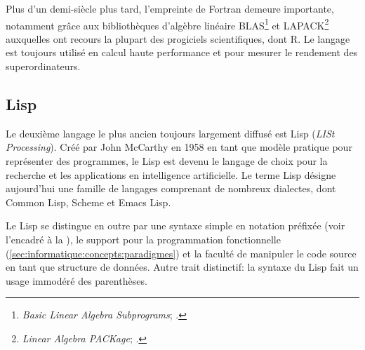 Plus d'un demi-siècle plus tard, l'empreinte de Fortran demeure
importante, notamment grâce aux bibliothèques d'algèbre linéaire
BLAS\footnote{%
  \emph{Basic Linear Algebra Subprograms};
  .} %
et LAPACK\footnote{%
  \emph{Linear Algebra PACKage};
  .} %
auxquelles ont recours la plupart des progiciels scientifiques, dont
R. Le langage est toujours utilisé en calcul haute performance et pour
mesurer le rendement des superordinateurs.


\subsection{Lisp}
\label{sec:informatique:historique:lisp}

Le deuxième langage le plus ancien toujours largement diffusé est
Lisp (\emph{LISt Processing}). Créé par John McCarthy en
1958 en tant que modèle pratique pour représenter des programmes, le
Lisp est devenu le langage de choix pour la recherche et les
applications en intelligence artificielle. Le terme Lisp désigne
aujourd'hui une famille de langages comprenant de nombreux dialectes,
dont Common Lisp, Scheme et Emacs Lisp.

Le Lisp se distingue en outre par une syntaxe simple en
notation préfixée (voir l'encadré à la
), le support pour la
programmation fonctionnelle
(\autoref{sec:informatique:concepts:paradigmes}) et la faculté de
manipuler le code source en tant que structure de données. Autre trait
distinctif: la syntaxe du Lisp fait un usage immodéré des parenthèses.

